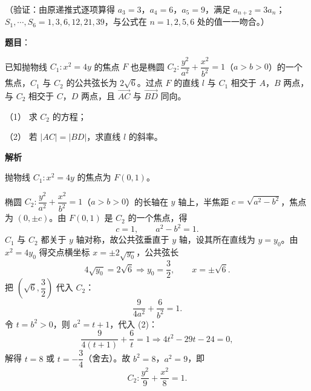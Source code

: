 \begin{answer}
（验证：由原递推式逐项算得 \(a_3=3\)，\(a_4=6\)，\(a_5=9\)，满足 \(a_{n+2}=3a_n\)；\(S_1,\cdots,S_6=1,3,6,12,21,39\)，与公式在 \(n=1,2,5,6\) 处的值一一吻合。）



\end{answer}
\begin{answer}

\textbf{题目}：

已知抛物线 \(C_1:x^2=4y\) 的焦点 \(F\) 也是椭圆 \(C_2:\dfrac{y^2}{a^2}+\dfrac{x^2}{b^2}=1\)（\(a>b>0\)）的一个焦点，\(C_1\) 与 \(C_2\) 的公共弦长为 \(2\sqrt6\)。过点 \(F\) 的直线 \(l\) 与 \(C_1\) 相交于 \(A\)，\(B\) 两点，与 \(C_2\) 相交于 \(C\)，\(D\) 两点，且 \(\overrightarrow{AC}\) 与 \(\overrightarrow{BD}\) 同向。

（1） 求 \(C_2\) 的方程；

（2） 若 \(|AC|=|BD|\)，求直线 \(l\) 的斜率。

\textbf{解析}


抛物线 \(C_1:x^2=4y\) 的焦点为 \(F(0,1)\)。

椭圆 \(C_2:\dfrac{y^2}{a^2}+\dfrac{x^2}{b^2}=1\)（\(a>b>0\)）的长轴在 \(y\) 轴上，半焦距 \(c=\sqrt{a^2-b^2}\)，焦点为 \((0,\pm c)\)。由 \(F(0,1)\) 是 \(C_2\) 的一个焦点，得
\nopagebreak[4]
\[
c=1,\qquad a^2-b^2=1. \tag{1}
\]
\(C_1\) 与 \(C_2\) 都关于 \(y\) 轴对称，故公共弦垂直于 \(y\) 轴，设其所在直线为 \(y=y_0\)。由 \(x^2=4y_0\) 得交点横坐标 \(x=\pm2\sqrt{y_0}\)，公共弦长
\nopagebreak[4]
\[
4\sqrt{y_0}=2\sqrt6\Longrightarrow y_0=\dfrac32,\qquad x=\pm\sqrt6.
\]
把 \(\left(\sqrt6,\dfrac32\right)\) 代入 \(C_2\)：
\nopagebreak[4]
\[
\dfrac{9}{4a^2}+\dfrac{6}{b^2}=1. \tag{2}
\]
令 \(t=b^2>0\)，则 \(a^2=t+1\)，代入 (2)：
\nopagebreak[4]
\[
\dfrac{9}{4(t+1)}+\dfrac6t=1
\Longrightarrow 4t^2-29t-24=0,
\]
解得 \(t=8\) 或 \(t=-\dfrac34\)（舍去）。故 \(b^2=8\)，\(a^2=9\)，即
\nopagebreak[4]
\[
C_2:\dfrac{y^2}{9}+\dfrac{x^2}{8}=1.
\]



\end{answer}
